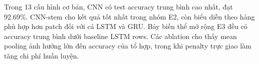 Trong 13 cấu hình cơ bản, CNN có test accuracy trung bình cao nhất, đạt 92.69\%. CNN-stem cho kết quả tốt nhất trong nhóm E2, còn biểu diễn theo hàng phù hợp hơn patch đối với cả LSTM và GRU. Bảy biến thể mở rộng E3 đều có accuracy trung bình dưới baseline LSTM rows. Các ablation cho thấy mean pooling ảnh hưởng lớn đến accuracy của tổ hợp, trong khi penalty trực giao làm tăng chi phí huấn luyện.
